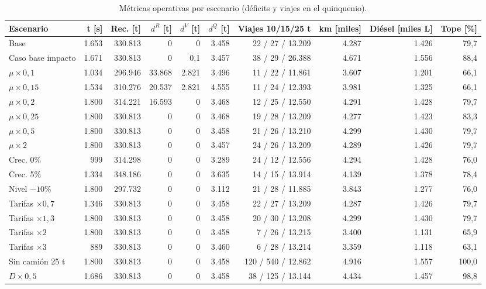 \documentclass[letterpaper]{article}
\begin{document}
\begin{table}[H]
\centering
\caption{Métricas operativas por escenario (déficits y viajes en el quinquenio).}
\label{tab:anexo_sens}
\scriptsize
\setlength{\tabcolsep}{2.5pt}
\begin{tabular*}{\linewidth}{@{\extracolsep{\fill}}lrrrrrrrrr@{}}
\hline
\textbf{Escenario} & \textbf{t [s]} & \textbf{Rec. [t]} & \textbf{$d^R$ [t]} & \textbf{$d^V$ [t]} & \textbf{$d^Q$ [t]} & \textbf{Viajes 10/15/25 t} & \textbf{km [miles]} & \textbf{Diésel [miles L]} & \textbf{Tope [\%]} \\
\hline
Base & 1.653 & 330.813 & 0 & 0 & 3.458 & 22 / 27 / 13.209 & 4.287 & 1.426 & 79,7 \\
Caso base impacto & 1.671 & 330.813 & 0 & 0,1 & 3.457 & 38 / 29 / 26.388 & 4.671 & 1.556 & 88,4 \\
$\mu\times0,1$ & 1.034 & 296.946 & 33.868 & 2.821 & 3.496 & 11 / 22 / 11.861 & 3.607 & 1.201 & 66,1 \\
$\mu\times0,15$ & 1.534 & 310.276 & 20.537 & 2.821 & 4.555 & 11 / 24 / 12.393 & 3.981 & 1.325 & 66,1 \\
$\mu\times0,2$ & 1.800 & 314.221 & 16.593 & 0 & 3.468 & 12 / 25 / 12.550 & 4.291 & 1.428 & 79,7 \\
$\mu\times0,25$ & 1.800 & 330.813 & 0 & 0 & 3.468 & 19 / 28 / 13.209 & 4.277 & 1.423 & 83,3 \\
$\mu\times0,5$ & 1.800 & 330.813 & 0 & 0 & 3.458 & 21 / 26 / 13.210 & 4.299 & 1.430 & 79,7 \\
$\mu\times2$ & 1.800 & 330.813 & 0 & 0 & 3.457 & 24 / 26 / 13.209 & 4.289 & 1.426 & 79,7 \\
Crec. 0\% & 999 & 314.298 & 0 & 0 & 3.289 & 24 / 12 / 12.556 & 4.294 & 1.428 & 76,0 \\
Crec. 5\% & 1.334 & 348.186 & 0 & 0 & 3.635 & 14 / 15 / 13.914 & 4.139 & 1.378 & 78,4 \\
Nivel $-10\%$ & 1.800 & 297.732 & 0 & 0 & 3.112 & 21 / 28 / 11.885 & 3.843 & 1.277 & 76,0 \\
Tarifas $\times0,7$ & 1.346 & 330.813 & 0 & 0 & 3.458 & 22 / 27 / 13.209 & 4.287 & 1.426 & 79,7 \\
Tarifas $\times1,3$ & 1.800 & 330.813 & 0 & 0 & 3.458 & 20 / 30 / 13.208 & 4.299 & 1.430 & 79,7 \\
Tarifas $\times2$ & 1.800 & 330.813 & 0 & 0 & 3.458 & 7 / 26 / 13.215 & 3.400 & 1.131 & 65,9 \\
Tarifas $\times3$ & 889 & 330.813 & 0 & 0 & 3.460 & 6 / 28 / 13.214 & 3.359 & 1.118 & 63,1 \\
Sin camión 25 t & 1.800 & 330.813 & 0 & 0 & 3.458 & 120 / 540 / 12.862 & 4.916 & 1.557 & 100,0 \\
$D\times0,5$ & 1.686 & 330.813 & 0 & 0 & 3.458 & 38 / 125 / 13.144 & 4.434 & 1.457 & 98,8 \\
\hline
\end{tabular*}
\end{table}
\end{document}
